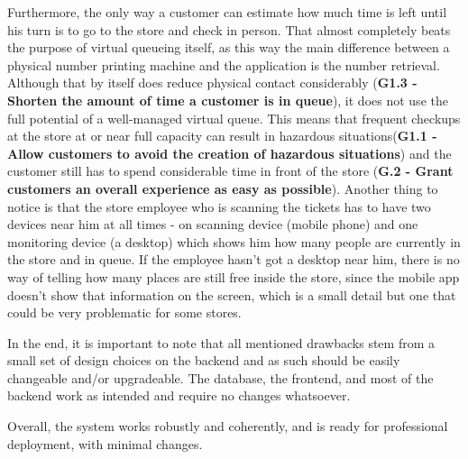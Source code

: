 Furthermore, the only way a customer can estimate how much time is left until his turn is to go to the store and check in person. That almost completely beats the purpose of virtual queueing itself, as this way the main difference between a physical number printing machine and the application is the number retrieval. Although that by itself  does reduce physical contact considerably (\textbf{G1.3 - Shorten the amount of time a customer is in queue}), it does not use the full potential of a well-managed virtual queue. This means that frequent checkups at the store at or near full capacity can result in hazardous situations(\textbf{G1.1 - Allow customers to avoid the creation of hazardous situations}) and the customer still has to spend considerable time in front of the store (\textbf{G.2 - Grant customers an overall experience as easy as possible}). Another thing to notice is that the store employee who is scanning the tickets has to have two devices near him at all times - on scanning device (mobile phone) and one monitoring device (a desktop) which shows him how many people are currently in the store and in queue. If the employee hasn't got a desktop near him, there is no way of telling how many places are still free inside the store, since the mobile app doesn't show that information on the screen, which is a small detail but one that could be very problematic for some stores. \newline

In the end, it is important to note that all mentioned drawbacks stem from a small set of design choices on the backend and as such should be easily changeable and/or upgradeable. The database, the frontend, and most of the backend work as intended and require no changes whatsoever.\newline

Overall, the system works robustly and coherently, and is ready for professional deployment, with minimal changes. 